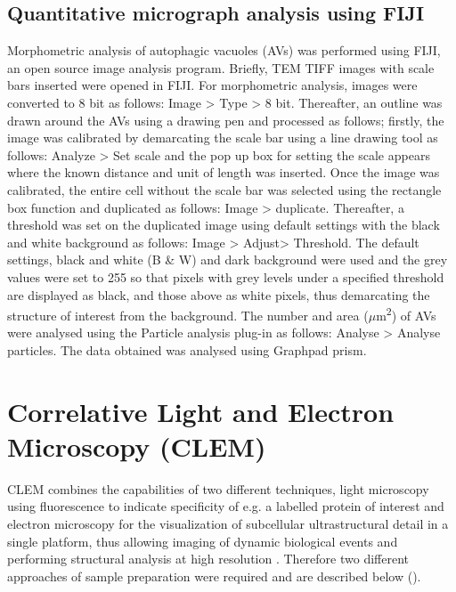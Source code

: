 \subsection{Quantitative micrograph analysis using FIJI}
Morphometric analysis of autophagic vacuoles (AVs) \citep{Kawaoka2017,Swanlund2010} was performed using FIJI, an open source image analysis program. Briefly, TEM TIFF images with scale bars inserted were opened in FIJI. For morphometric analysis, images were converted to 8 bit as follows: Image > Type > 8 bit. Thereafter, an outline was drawn around the AVs using a drawing pen and processed as follows; firstly, the image was calibrated by demarcating the scale bar using a line drawing tool as follows: Analyze > Set scale and the pop up box for setting the scale appears where the known distance and unit of length was inserted. Once the image was calibrated, the entire cell without the scale bar was selected using the rectangle box function and duplicated as follows: Image > duplicate. Thereafter, a threshold was set on the duplicated image using default settings with the black and white background as follows: Image > Adjust> Threshold. The default settings, black and white (B \& W) and dark background were used and the grey values were set to 255 so that pixels with grey levels under a specified threshold are displayed as black, and those above as white pixels, thus demarcating the structure of interest from the background. The number and area ($\mu$m\textsuperscript{2}) of AVs were analysed using the Particle analysis plug-in as follows: Analyse > Analyse particles. The data obtained was analysed using Graphpad prism. 

\section{Correlative Light and Electron Microscopy (CLEM)} 
CLEM combines the capabilities of two different techniques, light microscopy using fluorescence to indicate specificity of e.g. a labelled protein of interest and electron microscopy for the visualization of subcellular ultrastructural detail in a single platform, thus allowing imaging of dynamic biological events and performing structural analysis at high resolution \citep{Russell2017}. Therefore two different approaches of sample preparation were required and are described below (). 

